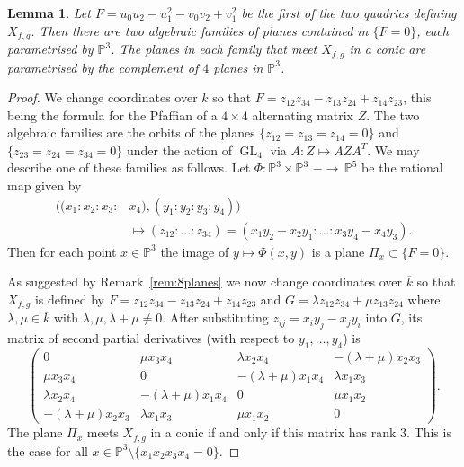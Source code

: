 \documentclass[12pt]{amsart}
\newcommand{\GL}{\operatorname{GL}}
\newcommand{\PP}{{\mathbb P}}
\newcommand{\kbar}{{\overline k}}
\newtheorem{Lemma}[Proposition]{Lemma}
\theoremstyle{definition}
\begin{document}
\begin{Lemma}
  \label{lem:getconic}
  Let $F = u_0u_2 - u_1^2 - v_0v_2 + v_1^2$ be the first of the two
  quadrics defining $X_{f,g}$. Then there are two algebraic families
  of planes contained in $\{ F = 0 \}$, each parametrised by $\PP^3$.
  The planes in each family that meet $X_{f,g}$ in a conic are
  parametrised by the complement of $4$ planes in $\PP^3$.
\end{Lemma}
\begin{proof}
  We change coordinates over $k$ so that
  $F = z_{12} z_{34} - z_{13} z_{24} + z_{14} z_{23}$, this being the
  formula for the Pfaffian of a $4 \times 4$ alternating matrix
  $Z$. The two algebraic families are the orbits of the planes
  $\{ z_{12} = z_{13} = z_{14} = 0\}$ and
  $\{z_{23} = z_{24} = z_{34} = 0\}$ under the action of $\GL_4$ via
  $A: Z \mapsto A Z A^T$. We may describe one of these families as
  follows.  Let $\Phi : \PP^3 \times \PP^3 \,\, - \to \, \PP^5$ be the
  rational map given by
  \begin{align*}
    ((x_1:x_2:x_3:&x_4),(y_1:y_2:y_3:y_4)) \\ &\mapsto (z_{12} :
    \ldots : z_{34} ) = (x_1 y_2 - x_2 y_1 : \ldots : x_3 y_4 - x_4 y_3).
  \end{align*}
  Then for each point $x \in \PP^3$ the image of $y \mapsto \Phi(x,y)$
  is a plane $\Pi_x \subset \{F = 0\}$.

  As suggested by Remark~\ref{rem:8planes} we now change coordinates
  over $\kbar$ so that $X_{f,g}$ is defined by
  $F = z_{12} z_{34} - z_{13} z_{24} + z_{14} z_{23}$ and
  $G = \lambda z_{12} z_{34} + \mu z_{13} z_{24}$ where
  $\lambda,\mu \in \kbar$ with $\lambda,\mu,\lambda+\mu \not= 0$.
  After substituting $z_{ij} = x_i y_j - x_j y_i$ into $G$, its matrix
  of second partial derivatives (with respect to $y_1, \ldots, y_4$) is
  \[ \begin{pmatrix}
      0 & \mu x_3 x_4 & \lambda x_2 x_4  &-(\lambda + \mu) x_2 x_3 \\
      \mu x_3 x_4 & 0 &-(\lambda+ \mu) x_1 x_4 & \lambda x_1 x_3 \\
      \lambda x_2 x_4 &-(\lambda + \mu) x_1 x_4 & 0 & \mu x_1 x_2 \\
      -(\lambda + \mu) x_2 x_3 & \lambda x_1 x_3 & \mu x_1 x_2 & 0
   \end{pmatrix}. \]
 The plane $\Pi_x$ meets $X_{f,g}$ in a conic if and only if this
 matrix has rank $3$. This is the case for all
 $x \in \PP^3 \setminus \{ x_1 x_2 x_3 x_4 = 0 \}$.
\end{proof}
\end{document}
